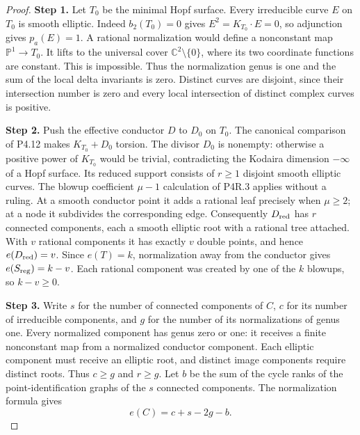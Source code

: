 \begin{proof}
\noindent\textbf{Step 1.} Let $T_0$ be the minimal Hopf surface. Every
irreducible curve $E$ on $T_0$ is smooth elliptic.
Indeed $b_2(T_0)=0$ gives $E^2=K_{T_0}\cdot E=0$,
so adjunction gives $p_a(E)=1$. A rational
normalization would define a nonconstant map
$\mathbb P^1\to T_0$. It lifts to the universal
cover $\mathbb C^2\setminus\{0\}$, where its two
coordinate functions are constant. This is
impossible. Thus the normalization genus is one
and the sum of the local delta invariants is zero.
Distinct curves are disjoint, since their
intersection number is zero and every local
intersection of distinct complex curves is
positive.

\noindent\textbf{Step 2.} Push the effective conductor $D$ to $D_0$ on
$T_0$. The canonical comparison of P4.12 makes
$K_{T_0}+D_0$ torsion. The divisor $D_0$ is
nonempty: otherwise a positive power of $K_{T_0}$
would be trivial, contradicting the Kodaira
dimension $-\infty$ of a Hopf surface. Its
reduced support consists of $r\ge1$ disjoint
smooth elliptic curves. The blowup coefficient
$\mu-1$ calculation of P4R.3 applies without a
ruling. At a smooth conductor point it adds a
rational leaf precisely when $\mu\ge2$; at a
node it subdivides the corresponding edge.
Consequently $D_{\rm red}$ has $r$ connected
components, each a smooth elliptic root with a
rational tree attached. With $v$ rational
components it has exactly $v$ double points,
and hence $e(D_{\rm red})=v$. Since
$e(T)=k$, normalization away from the conductor
gives $e(S_{\rm reg})=k-v$. Each rational
component was created by one of the $k$ blowups,
so $k-v\ge0$.

\noindent\textbf{Step 3.} Write $s$ for the number of connected components
of $C$, $c$ for its number of irreducible
components, and $g$ for the number of its
normalizations of genus one. Every normalized
component has genus zero or one: it receives a
finite nonconstant map from a normalized
conductor component. Each elliptic component
must receive an elliptic root, and distinct
image components require distinct roots.
Thus $c\ge g$ and $r\ge g$. Let $b$ be the sum
of the cycle ranks of the point-identification
graphs of the $s$ connected components. The
normalization formula gives
\[
 e(C)=c+s-2g-b.
\]


\end{proof}
